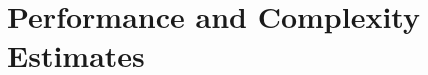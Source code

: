 \documentclass[12pt,single-column]{article}
\begin{document}
\section{Performance and Complexity Estimates}
\label{sec:summary_table}



\begin{comment}




\subsection{Write Access Policy}
\label{sec:write_policy}




\section{Conclusions}
\label{sec:conclusions}

{ 

\renewcommand{\bibfont}{\normalfont\small}

}

\end{comment}
\end{document}
